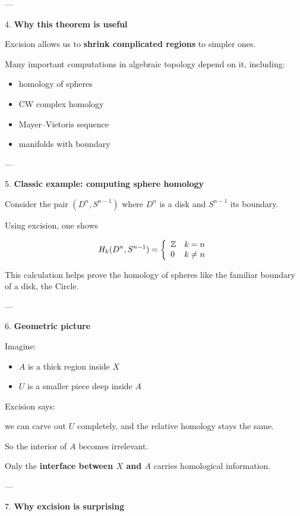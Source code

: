 \documentclass[12pt,a4paper]{report}
\begin{document}
\begin{description}
\begin{description}
\begin{itemize}
\end{itemize}
---

\item 4. \textbf{Why this theorem is useful}

Excision allows us to \textbf{shrink complicated regions} to simpler ones.

Many important computations in algebraic topology depend on it, including:

\begin{itemize}

\item homology of spheres
\item CW complex homology
\item Mayer–Vietoris sequence
\item manifolds with boundary
\end{itemize}

---

\item 5. \textbf{Classic example: computing sphere homology}

Consider the pair $(D^n, S^{n-1}) $ where $D^n$ is a disk and $S^{n-1}$ its boundary.

Using excision, one shows

$$ H_k(D^n,S^{n-1}) = \left \{ \begin{array}{ll} \mathbb{Z} & k=n \\  0 & k\neq n  \end{array} \right . $$

This calculation helps prove the homology of spheres like the familiar boundary of a disk, the Circle.

---

\item 6. \textbf{Geometric picture}

Imagine:

\begin{itemize}

\item $A$ is a thick region inside $X$
\item $U$ is a smaller piece deep inside $A$
\end{itemize}

Excision says:

\> we can carve out $U$ completely, and the relative homology stays the same.

So the interior of $A$ becomes irrelevant.

Only the \textbf{interface between $X$ and $A$} carries homological information.

---

\item 7. \textbf{Why excision is surprising}


\end{description}
\end{description}
\end{document}
